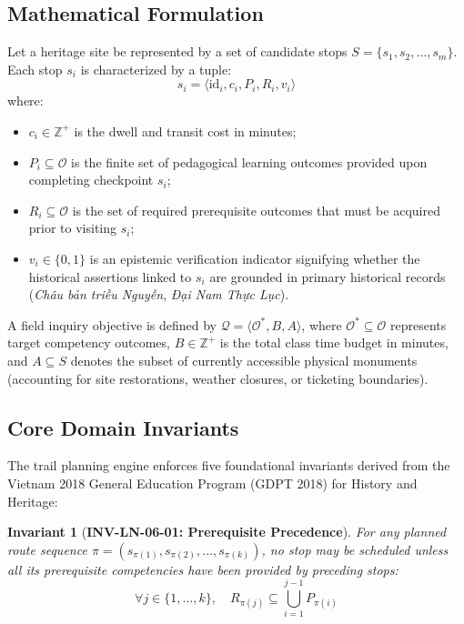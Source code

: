 \documentclass[11pt,a4paper]{article}
\newtheorem{invariant}{Invariant}
\begin{document}
\subsection{Mathematical Formulation}
Let a heritage site be represented by a set of candidate stops $S = \{s_1, s_2, \dots, s_m\}$. Each stop $s_i$ is characterized by a tuple:
\begin{equation}
s_i = \langle \text{id}_i, c_i, P_i, R_i, v_i \rangle
\end{equation}
where:
\begin{itemize}
    \item $c_i \in \mathbb{Z}^+$ is the dwell and transit cost in minutes;
    \item $P_i \subseteq \mathcal{O}$ is the finite set of pedagogical learning outcomes provided upon completing checkpoint $s_i$;
    \item $R_i \subseteq \mathcal{O}$ is the set of required prerequisite outcomes that must be acquired prior to visiting $s_i$;
    \item $v_i \in \{0, 1\}$ is an epistemic verification indicator signifying whether the historical assertions linked to $s_i$ are grounded in primary historical records (\textit{Châu bản triều Nguyễn}, \textit{Đại Nam Thực Lục}).
\end{itemize}

A field inquiry objective is defined by $\mathcal{Q} = \langle \mathcal{O}^*, B, A \rangle$, where $\mathcal{O}^* \subseteq \mathcal{O}$ represents target competency outcomes, $B \in \mathbb{Z}^+$ is the total class time budget in minutes, and $A \subseteq S$ denotes the subset of currently accessible physical monuments (accounting for site restorations, weather closures, or ticketing boundaries).

\subsection{Core Domain Invariants}
The trail planning engine enforces five foundational invariants derived from the Vietnam 2018 General Education Program (GDPT 2018) for History and Heritage:

\begin{invariant}[\textbf{INV-LN-06-01: Prerequisite Precedence}]
For any planned route sequence $\pi = (s_{\pi(1)}, s_{\pi(2)}, \dots, s_{\pi(k)})$, no stop may be scheduled unless all its prerequisite competencies have been provided by preceding stops:
\begin{equation}
\forall j \in \{1, \dots, k\}, \quad R_{\pi(j)} \subseteq \bigcup_{i=1}^{j-1} P_{\pi(i)}
\end{equation}
\end{invariant}
\end{document}
